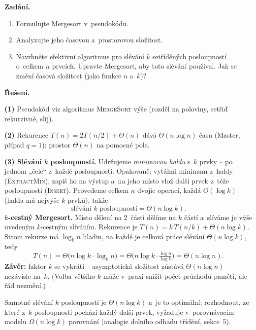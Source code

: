 \documentclass[11pt,a4paper]{article}
\begin{document}
\begin{priklad}
\par
\textbf{Zadání.}
\begin{enumerate}
  \item Formulujte Mergesort v~pseudokódu.
  \item Analyzujte jeho časovou a~prostorovou složitost.
  \item Navrhněte efektivní algoritmus pro slévání $k$ setříděných posloupností o~celkem $n$ prvcích. Upravte Mergesort, aby toto slévání používal. Jak se změní časová složitost (jako funkce $n$ a~$k$)?
\end{enumerate}

\smallskip
\textbf{Řešení.}\par
\textbf{(1)} Pseudokód viz algoritmus \textsc{MergeSort} výše (rozděl na poloviny, setřiď rekurzivně, slij).

\textbf{(2)} Rekurence $T(n)=2T(n/2)+\Theta(n)$ dává $\Theta(n\log n)$ času (Master, případ $q=1$); prostor $\Theta(n)$ na pomocné pole.

\textbf{(3) Slévání $k$ posloupností.} Udržujeme \emph{minimovou haldu} s~$k$ prvky -- po jednom „čele`` z~každé posloupnosti. Opakovaně: vytáhni minimum z~haldy (\textsc{ExtractMin}), zapiš ho na výstup a~na jeho místo vlož další prvek z~téže posloupnosti (\textsc{Insert}). Provedeme celkem $n$ dvojic operací, každá $O(\log k)$ (halda má nejvýše $k$ prvků), takže
\[
\text{slévání } k \text{ posloupností} = \boxed{\Theta(n\log k)}.
\]
\textbf{$k$-cestný Mergesort.} Místo dělení na 2~části dělíme na $k$ částí a~slíváme je výše uvedeným $k$-cestným slíváním. Rekurence je $T(n)=k\,T(n/k)+\Theta(n\log k)$. Strom rekurze má $\log_k n$ hladin, na každé je celková práce slévání $\Theta(n\log k)$, tedy
\[
T(n)=\Theta\!\big(n\log k\cdot \log_k n\big)=\Theta\!\Big(n\log k\cdot\tfrac{\log n}{\log k}\Big)=\boxed{\Theta(n\log n)}.
\]
\textbf{Závěr:} faktor $k$ se vykrátí -- asymptotická složitost zůstává $\Theta(n\log n)$ nezávisle na~$k$. (Volba většího $k$ může v~praxi snížit počet průchodů pamětí, ale řád nezmění.)

\begin{poznamka}
Samotné slévání $k$ posloupností je $\Theta(n\log k)$ a~je to optimální: rozhodnout, ze které z~$k$ posloupností pochází každý další prvek, vyžaduje v~porovnávacím modelu $\Omega(n\log k)$ porovnání (analogie dolního odhadu třídění, sekce~5).
\end{poznamka}
\end{priklad}
\end{document}
